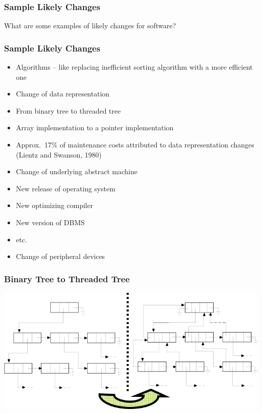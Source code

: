 \documentclass[t,12pt,numbers,fleqn]{beamer}
\begin{document}

\begin{frame}
\frametitle{Sample Likely Changes}

What are some examples of likely changes for software?

\end{frame}


\begin{frame}
\frametitle{Sample Likely Changes \cite{GhezziEtAl2003}}

\begin{itemize}

\item Algorithms -- like replacing inefficient sorting algorithm with a more
  efficient one
\item Change of data representation
\bi
\item From binary tree to threaded tree
\item Array implementation to a pointer implementation
\item Approx.\ 17\% of maintenance costs attributed to data representation
  changes (Lientz and Swanson, 1980)
\ei
\item Change of underlying abstract machine
\bi
\item New release of operating system
\item New optimizing compiler
\item New version of DBMS
\item etc.
\ei
\item Change of peripheral devices

\end{itemize}

\end{frame}


\begin{frame}
\frametitle{Binary Tree to Threaded Tree}

\begin{center}
\includegraphics[width=1.1\textwidth]{../Figures/BinTreeToThreadTree.png}
\end{center}

\end{frame}
\end{document}
